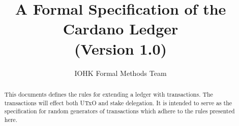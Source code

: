 
\title{A Formal Specification of the Cardano Ledger \\
       {\small (Version 1.0)}}

\author{IOHK Formal Methods Team}


\maketitle

\begin{abstract}
This documents defines the rules for extending a ledger with transactions.
The transactions will effect both UTxO and stake delegation.
It is intended to serve as the specification for random generators of transactions
which adhere to the rules presented here.
\end{abstract}
